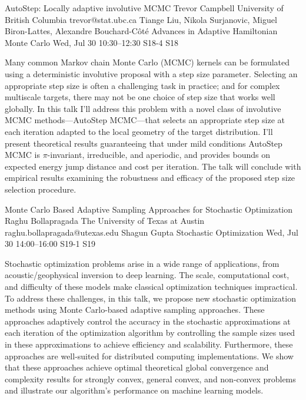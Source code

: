 \begin{talk}
  {AutoStep: Locally adaptive involutive MCMC}%
  {Trevor Campbell}%
  {University of British Columbia}%
  {trevor@stat.ubc.ca}%
  {Tiange Liu, Nikola Surjanovic, Miguel Biron-Lattes, Alexandre Bouchard-C\^ot\'e}%
  {Advances in Adaptive Hamiltonian Monte Carlo}%
  {Wed, Jul 30 10:30–12:30}%
  {S18-4}%
  {S18}%
				

\medskip

Many common Markov chain Monte Carlo (MCMC) kernels can be formulated using a deterministic involutive proposal with a step size parameter.  Selecting an appropriate step size is often a challenging task in practice; and for complex multiscale targets, there may not be one choice of step size that works well globally.  In this talk I'll address this problem with a novel class of involutive MCMC methods---AutoStep MCMC---that selects an appropriate step size at each iteration adapted to the local geometry of the target distribution.  I'll present theoretical results guaranteeing that under mild conditions AutoStep MCMC is $\pi$-invariant, irreducible, and aperiodic, and provides bounds on expected energy jump distance and cost per iteration. The talk will conclude with empirical results examining the robustness and efficacy of the proposed step size selection procedure.

\end{talk}

\begin{talk}
  {Monte Carlo Based Adaptive Sampling Approaches for Stochastic Optimization}%
  {Raghu Bollapragada}%
  {The University of Texas at Austin}%
  {raghu.bollapragada@utexas.edu}%
  {Shagun Gupta}%
  {Stochastic Optimization}%
  {Wed, Jul 30 14:00–16:00}%
  {S19-1}%
  {S19}%
				
			
Stochastic optimization problems arise in a wide range of applications, from acoustic/geophysical inversion to deep learning. The scale, computational cost, and difficulty of these models make classical optimization techniques impractical. To address these challenges, in this talk, we propose new stochastic optimization methods using Monte Carlo-based adaptive sampling approaches. These approaches adaptively control the accuracy in the stochastic approximations at each iteration of the optimization algorithm by controlling the sample sizes used in these approximations to achieve efficiency and scalability. Furthermore, these approaches are well-suited for distributed computing implementations. We show that these approaches achieve optimal theoretical global convergence and complexity results for strongly convex, general convex, and non-convex problems and illustrate our algorithm's performance on machine learning models.

\medskip

\end{talk}

